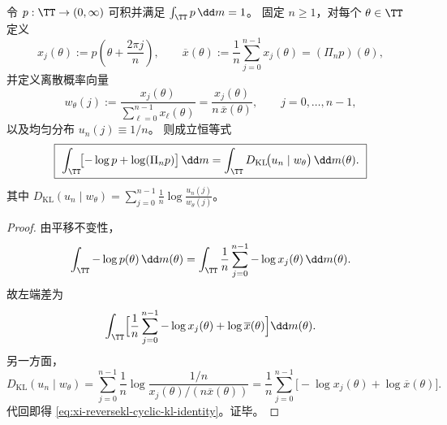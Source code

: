 \begin{theorem}[熵差的循环 KL 分解]\label{thm:xi-reversekl-cyclic-kl-decomposition}
令 \(p:\TT\to(0,\infty)\) 可积并满足 \(\int_{\TT}p\,\dd m=1\)。
固定 \(n\ge 1\)，对每个 \(\theta\in\TT\) 定义
\[
x_j(\theta):=p\!\left(\theta+\frac{2\pi j}{n}\right),\qquad
\overline x(\theta):=\frac1n\sum_{j=0}^{n-1}x_j(\theta)=(\Pi_n p)(\theta),
\]
并定义离散概率向量
\[
w_\theta(j):=\frac{x_j(\theta)}{\sum_{\ell=0}^{n-1}x_\ell(\theta)}
=\frac{x_j(\theta)}{n\,\overline x(\theta)},\qquad j=0,\dots,n-1,
\]
以及均匀分布 \(u_n(j)\equiv 1/n\)。
则成立恒等式
\begin{equation}\label{eq:xi-reversekl-cyclic-kl-identity}
\boxed{\ 
\int_{\TT}\!\bigl[-\log p+\log(\Pi_n p)\bigr]\,\dd m
=\int_{\TT}D_{\mathrm{KL}}\!\bigl(u_n\mid w_\theta\bigr)\,\dd m(\theta).
\ }
\end{equation}
其中 \(D_{\mathrm{KL}}(u_n\mid w_\theta)=\sum_{j=0}^{n-1}\frac1n\log\frac{u_n(j)}{w_\theta(j)}\)。
\end{theorem}
\begin{proof}
由平移不变性，
\[
\int_{\TT}-\log p(\theta)\,\dd m(\theta)
=\int_{\TT}\frac1n\sum_{j=0}^{n-1}-\log x_j(\theta)\,\dd m(\theta).
\]
故左端差为
\[
\int_{\TT}\Bigl[\frac1n\sum_{j=0}^{n-1}-\log x_j(\theta)+\log\overline x(\theta)\Bigr]\dd m(\theta).
\]
另一方面，
\[
D_{\mathrm{KL}}(u_n\mid w_\theta)
=\sum_{j=0}^{n-1}\frac1n\log\frac{1/n}{x_j(\theta)/(n\overline x(\theta))}
=\frac1n\sum_{j=0}^{n-1}\bigl[-\log x_j(\theta)+\log\overline x(\theta)\bigr].
\]
代回即得 \eqref{eq:xi-reversekl-cyclic-kl-identity}。证毕。
\end{proof}

